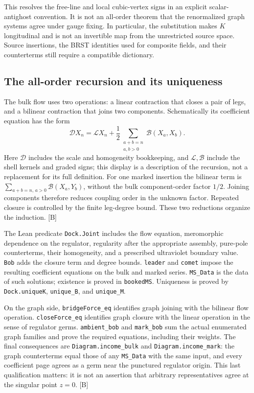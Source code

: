 \documentclass[11pt]{article}
\newcommand{\code}[1]{{\small\nolinkurl{#1}}}
\newcommand{\src}[1]{\textsf{[#1]}}
\begin{document}
This resolves the free-line and local cubic-vertex signs in an explicit
scalar-antighost convention. It is not an all-order theorem that the
renormalized graph systems agree under gauge fixing. In particular,
the substitution makes $K$ longitudinal and is not an invertible map
from the unrestricted source space. Source insertions, the BRST
identities used for composite fields, and their counterterms still
require a compatible dictionary.

\subsection{The all-order recursion and its uniqueness}

The bulk flow uses two operations: a linear contraction that closes a
pair of legs, and a bilinear contraction that joins two components.
Schematically its coefficient equation has the form
\[
 \mathcal D X_n=\mathcal L X_n+
       \frac12\sum_{\substack{a+b=n\\a,b>0}}\mathcal B(X_a,X_b).
\]
Here $\mathcal D$ includes the scale and homogeneity bookkeeping,
and $\mathcal L,\mathcal B$ include the shell kernels and graded signs;
this display is a description of the recursion, not a replacement for
its full definition. For one marked insertion the bilinear term is
$\sum_{a+b=n,\,a>0}\mathcal B(X_a,Y_b)$, without the bulk
component-order factor $1/2$. Joining components therefore reduces
coupling order in the unknown factor. Repeated closure is controlled
by the finite leg-degree bound. These two reductions organize the
induction. \src{B}

The Lean predicate \code{Dock.Joint} includes the flow equation,
meromorphic dependence on the regulator, regularity after the
appropriate assembly, pure-pole counterterms, their homogeneity,
and a prescribed ultraviolet boundary value. \code{Bob} adds the
closure term and degree bounds. \code{leader} and \code{comet}
impose the resulting coefficient equations on the bulk and marked
series. \code{MS_Data} is the data of such solutions; existence is
proved in \code{bookedMS}. Uniqueness is proved by
\code{Dock.uniqueK}, \code{unique_B}, and \code{unique_M}.

On the graph side, \code{bridgeForce_eq} identifies graph joining with
the bilinear flow operation. \code{closeForce_eq} identifies graph
closure with the linear operation in the sense of regulator germs.
\code{ambient_bob} and \code{mark_bob} sum the actual enumerated graph
families and prove the required equations, including their weights.
The final consequences are
\code{Diagram.income_bulk} and \code{Diagram.income_mark}:
the graph counterterms equal those of any \code{MS_Data} with the same
input, and every coefficient page agrees as a germ near the punctured
regulator origin. This last qualification matters: it is not an
assertion that arbitrary representatives agree at the singular point
$z=0$. \src{B}
\end{document}
